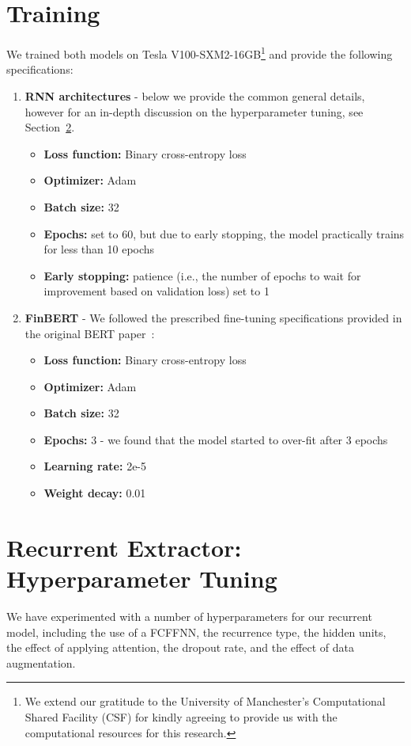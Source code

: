 \section{Training}\label{sec:training}
We trained both models on Tesla V100-SXM2-16GB\footnote{
    We extend our gratitude to the University of Manchester's Computational Shared Facility (CSF) for kindly agreeing to provide us with the computational resources for this research.
} and provide the following specifications:
\begin{enumerate}
    \item \textbf{RNN architectures} - below we provide the common general details, however for an in-depth discussion on the hyperparameter tuning, see Section~\ref{sec:hyperparameters}.
        \begin{itemize}
            \item \textbf{Loss function:} Binary cross-entropy loss
            \item \textbf{Optimizer:} Adam~\cite{kingma2017adam}
            \item \textbf{Batch size:} 32
            \item \textbf{Epochs:} set to 60, but due to early stopping, the model practically trains for less than 10 epochs
            \item \textbf{Early stopping:} patience (i.e., the number of epochs to wait for improvement based on validation loss) set to 1
        \end{itemize}
    \item \textbf{FinBERT} - We followed the prescribed fine-tuning specifications provided in the original BERT paper~\cite{devlin-etal-2019-bert}:
        \begin{itemize}
            \item \textbf{Loss function:} Binary cross-entropy loss
            \item \textbf{Optimizer:} Adam~\cite{kingma2017adam}
            \item \textbf{Batch size:} 32
            \item \textbf{Epochs:} 3 - we found that the model started to over-fit after 3 epochs
            \item \textbf{Learning rate:} 2e-5
            \item \textbf{Weight decay:} 0.01
        \end{itemize}
\end{enumerate}


\section{Recurrent Extractor: Hyperparameter Tuning}\label{sec:hyperparameters}
We have experimented with a number of hyperparameters for our recurrent model, including the use of a FCFFNN,
the recurrence type, the hidden units, the effect of applying attention, the dropout rate, and the effect of data augmentation.

